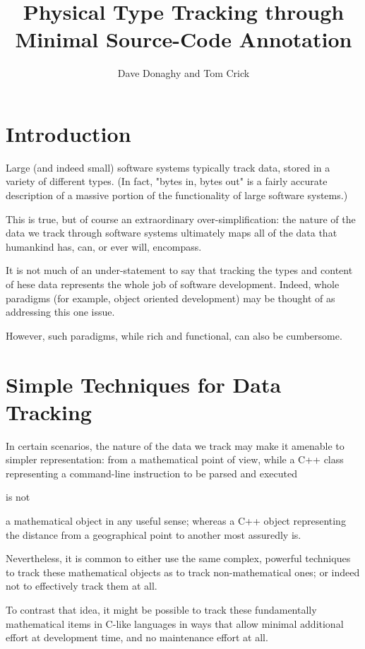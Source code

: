 \documentclass{eceasst}
\title{Physical Type Tracking through Minimal Source-Code Annotation} %
\author{%
Dave Donaghy\autref{1} and
Tom Crick\autref{2}}
\institute{%
\autlabel{1} \email{dave.donaghy@hp.com}\\
HP Bristol, UK\par
\autlabel{2} \email{tcrick@cardiffmet.ac.uk}\\
Department of Computing\\
Cardiff Metropolitan University, UK}
\begin{document}
\maketitle

\section{Introduction}
Large (and indeed small) software systems typically track data, stored
in a variety of different types.  (In fact, "bytes in, bytes out" is a
fairly accurate description of a massive portion of the functionality
of large software systems.)

This is true, but of course an extraordinary over-simplification: the
nature of the data we track through software systems ultimately maps
all of the data that humankind has, can, or ever will, encompass.

It is not much of an under-statement to say that tracking the types and
content of hese data represents the whole job of software development.
Indeed, whole paradigms (for example, object oriented development)
may be thought of as addressing this one issue.

However, such paradigms, while rich and functional, can also be cumbersome.

\section{Simple Techniques for Data Tracking}

In certain scenarios, the nature of the data we track may make it amenable
to simpler representation: from a mathematical point of view, while a C++
class representing a command-line instruction to be parsed and executed
\begin{em}is not\end{em} a mathematical object in any useful sense;
whereas a C++ object representing the distance from a geographical point
to another most assuredly is.

Nevertheless, it is common to either use the same complex,
powerful techniques to track these mathematical objects as to track
non-mathematical ones; or indeed not to effectively track them at all.

To contrast that idea, it might be possible to track these fundamentally
mathematical items in C-like languages in ways that allow minimal
additional effort at development time, and no maintenance effort at all.
\end{document}
